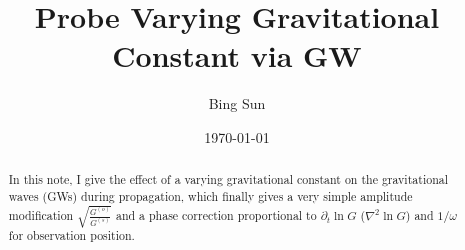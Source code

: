 \documentclass[
 jor,
 amsmath,amssymb,preprint,
]{revtex4-2}
\begin{document}

\title[Probe Varying Gravitational Constant via GW]{Probe Varying Gravitational Constant via GW}%



\author{Bing Sun}
%

\date{\today}%

\begin{abstract}
In this note, I give the effect of a varying gravitational constant on the gravitational waves (GWs) during propagation, which finally gives a very simple amplitude modification $\sqrt{\frac{G^{(o)}}{G^{(s)}}}$ and a phase correction proportional to $\partial_t\ln G$ ($\nabla^2 \ln G$) and $1/\omega$ for observation position.
%
\end{abstract}


\maketitle
\end{document}

